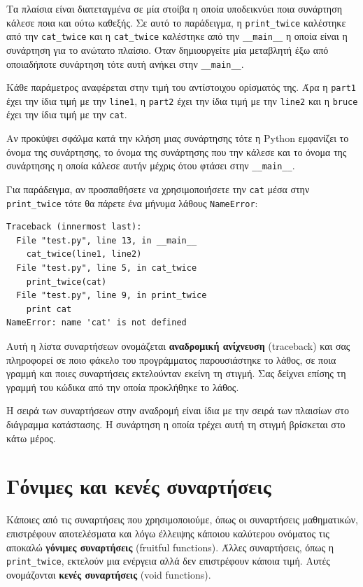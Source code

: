 \documentclass[10pt]{book}
\begin{document}
Τα πλαίσια είναι διατεταγμένα σε μία στοίβα
η οποία υποδεικνύει ποια συνάρτηση κάλεσε ποια και ούτω καθεξής. Σε αυτό το
παράδειγμα, η \verb"print_twice" καλέστηκε από την \verb"cat_twice"
και η \verb"cat_twice" καλέστηκε από την \verb"__main__"
η οποία είναι η συνάρτηση για το ανώτατο πλαίσιο. Όταν δημιουργείτε μία
μεταβλητή έξω από οποιαδήποτε συνάρτηση τότε αυτή ανήκει στην \verb"__main__".


Κάθε παράμετρος αναφέρεται στην τιμή του αντίστοιχου ορίσματός της.
Άρα η {\tt part1} έχει την ίδια τιμή με την {\tt line1}, 
η {\tt part2} έχει την ίδια τιμή με την {\tt line2}  και
η {\tt bruce} έχει την ίδια τιμή με την {\tt cat}.


Αν προκύψει σφάλμα κατά την κλήση μιας συνάρτησης τότε η Python
εμφανίζει το όνομα της συνάρτησης, το όνομα της συνάρτησης που την κάλεσε
και το όνομα της συνάρτησης η οποία κάλεσε αυτήν μέχρις ότου φτάσει στην
\verb"__main__".


Για παράδειγμα, αν προσπαθήσετε να χρησιμοποιήσετε την  {\tt cat} 
μέσα στην \verb"print_twice" τότε θα πάρετε ένα μήνυμα λάθους {\tt NameError}:


\begin{verbatim}
Traceback (innermost last):
  File "test.py", line 13, in __main__
    cat_twice(line1, line2)
  File "test.py", line 5, in cat_twice
    print_twice(cat)
  File "test.py", line 9, in print_twice
    print cat
NameError: name 'cat' is not defined
\end{verbatim}
%

Αυτή η λίστα συναρτήσεων ονομάζεται {\bf αναδρομική ανίχνευση} (traceback) και σας πληροφορεί σε ποιο φάκελο του προγράμματος παρουσιάστηκε το λάθος, σε ποια γραμμή και ποιες συναρτήσεις εκτελούνταν εκείνη τη στιγμή. Σας δείχνει επίσης τη γραμμή του κώδικα από την οποία προκλήθηκε το λάθος.

Η σειρά των συναρτήσεων στην αναδρομή είναι ίδια με την σειρά των
πλαισίων στο διάγραμμα κατάστασης. Η συνάρτηση η οποία τρέχει αυτή τη στιγμή 
βρίσκεται στο κάτω μέρος.



\section{Γόνιμες και κενές συναρτήσεις}

Κάποιες από τις συναρτήσεις που χρησιμοποιούμε, όπως οι συναρτήσεις
μαθηματικών, επιστρέφουν αποτελέσματα και λόγω έλλειψης κάποιου καλύτερου ονόματος τις αποκαλώ {\bf γόνιμες συναρτήσεις} (fruitful functions). Άλλες συναρτήσεις, όπως η \verb"print_twice", εκτελούν μια ενέργεια αλλά δεν επιστρέφουν κάποια τιμή. Αυτές ονομάζονται {\bf κενές συναρτήσεις} (void functions).
\end{document}

